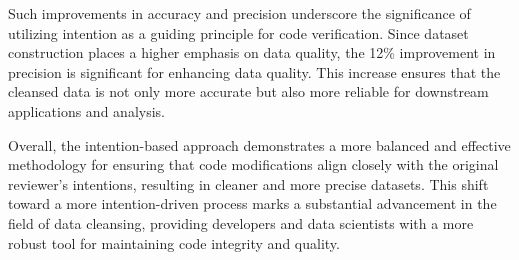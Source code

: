 
Such improvements in accuracy and precision underscore the significance of utilizing intention as a guiding principle for code verification. Since dataset construction places a higher emphasis on data quality, the 12\% improvement in precision is significant for enhancing data quality. This increase ensures that the cleansed data is not only more accurate but also more reliable for downstream applications and analysis.

Overall, the intention-based approach demonstrates a more balanced and effective methodology for ensuring that code modifications align closely with the original reviewer's intentions, resulting in cleaner and more precise datasets. This shift toward a more intention-driven process marks a substantial advancement in the field of data cleansing, providing developers and data scientists with a more robust tool for maintaining code integrity and quality.

\vspace{5pt}\noindent {}

